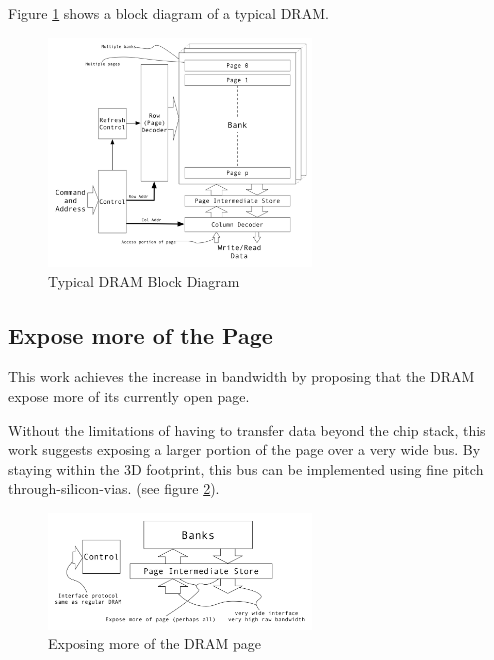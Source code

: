 \documentclass[journal]{IEEEtran}
\begin{document}
Figure \ref{fig:dramBlockDiagram} shows a block diagram of a typical DRAM.

\begin{figure}[!t]
\centering
\captionsetup{justification=centering}
\centerline{
\mbox{\includegraphics[width=2.75in]{DRAMBlockDiagram.jpg}}
}
\center\caption{Typical DRAM Block Diagram}
\label{fig:dramBlockDiagram}
\end{figure}

\subsection{Expose more of the Page}
\label{sec:exposeMorePage}

This work achieves the increase in bandwidth by proposing that the DRAM expose more of its currently open page.

Without the limitations of having to transfer data beyond the chip stack, this work suggests exposing a larger portion of the page over a very wide bus. By staying within the 3D footprint, this bus can be implemented using fine pitch through-silicon-vias.
(see figure \ref{fig:dramBusChange}).

\begin{figure}[!t]
\centering
\captionsetup{justification=centering}
\captionsetup{width=.9\linewidth}
\centerline{
\mbox{\includegraphics[width=2.75in]{DRAMBusChange.jpg}}
}
\center\caption{Exposing more of the DRAM page}
\label{fig:dramBusChange}
\end{figure}
\end{document}
